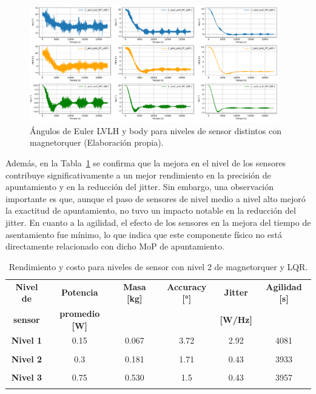 \begin{figure}[H]
	\centering    
	\includegraphics[width=0.97\textwidth]{MT_LQR_sensores.pdf}
	\caption{Ángulos de Euler LVLH y body para niveles de sensor distintos con magnetorquer (Elaboración propia).}
	\label{fig:MT_LQR_sensores}
\end{figure}

Además, en la Tabla~\ref{tab:MT_LQR_sensores} se confirma que la mejora en el nivel de los sensores contribuye significativamente a un mejor rendimiento en la precisión de apuntamiento y en la reducción del jitter. Sin embargo, una observación importante es que, aunque el paso de sensores de nivel medio a nivel alto mejoró la exactitud de apuntamiento, no tuvo un impacto notable en la reducción del jitter. En cuanto a la agilidad, el efecto de los sensores en la mejora del tiempo de asentamiento fue mínimo, lo que indica que este componente físico no está directamente relacionado con dicho MoP de apuntamiento.

\begin{table}[h!]
	\centering
	\caption{Rendimiento y costo para niveles de sensor con nivel 2 de magnetorquer y LQR.}
	\begin{tabular}{|c|c|c|c|c|c|}
		\hline
		\textbf{Nivel de}   & \textbf{Potencia} & \textbf{Masa [kg]} & \textbf{Accuracy [°]} & \textbf{Jitter} & \textbf{Agilidad [s]}  \\ 
		\textbf{sensor}  & \textbf{promedio [W]} & & & \textbf{[W/Hz]} &  \\
		\hline
		\textbf{Nivel 1}   & 0.15  & 0.067  & 3.72 & 2.92 & 4081   \\
		&  &   &  &  &    \\
		\hline
		\textbf{Nivel 2}   & 0.3  & 0.181  & 1.71 & 0.43 & 3933   \\
		& & & & &   \\
		\hline
		\textbf{Nivel 3}   & 0.75  & 0.530  & 1.5 & 0.43 & 3957   \\
		& & & & &   \\
		\hline		
	\end{tabular}
	\label{tab:MT_LQR_sensores}
\end{table}

